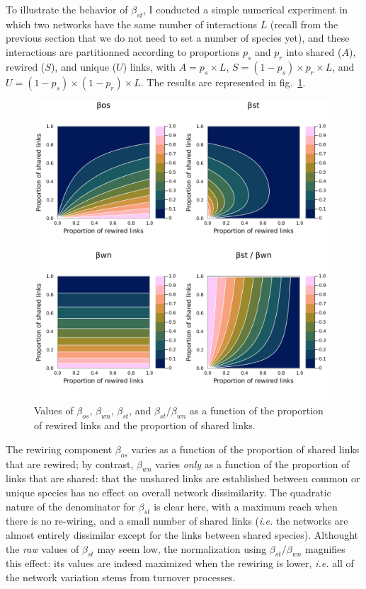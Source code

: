\documentclass[11pt]{article}
\makeatletter
\def\maxwidth{\ifdim\Gin@nat@width>\linewidth\linewidth
\else\Gin@nat@width\fi}
\let\Oldincludegraphics\includegraphics
\renewcommand{\includegraphics}[1]{\Oldincludegraphics[width=\maxwidth]{#1}}
\makeatother
\begin{document}
To illustrate the behavior of \(\beta_{st}\), I conducted a simple
numerical experiment in which two networks have the same number of
interactions \(L\) (recall from the previous section that we do not need
to set a number of species yet), and these interactions are partitionned
according to proportions \(p_s\) and \(p_r\) into shared (\(A\)),
rewired (\(S\)), and unique (\(U\)) links, with \(A = p_s\times L\),
\(S = (1-p_s)\times p_r\times L\), and
\(U = (1-p_s)\times (1-p_r)\times L\). The results are represented in
fig.~\ref{fig:numexp1}.

\begin{figure}
\hypertarget{fig:numexp1}{%
\centering
\includegraphics{figures/numexp1.png}
\caption{Values of \(\beta_{os}\), \(\beta_{wn}\), \(\beta_{st}\), and
\(\beta_{st}/\beta_{wn}\) as a function of the proportion of rewired
links and the proportion of shared links.}\label{fig:numexp1}
}
\end{figure}

The rewiring component \(\beta_{os}\) varies as a function of the
proportion of shared links that are rewired; by contrast, \(\beta_{wn}\)
varies \emph{only} as a function of the proportion of links that are
shared: that the unshared links are established between common or unique
species has no effect on overall network dissimilarity. The quadratic
nature of the denominator for \(\beta_{st}\) is clear here, with a
maximum reach when there is no re-wiring, and a small number of shared
links (\emph{i.e.} the networks are almost entirely dissimilar except
for the links between shared species). Althought the \emph{raw} values
of \(\beta_{st}\) may seem low, the normalization using
\(\beta_{st}/\beta_{wn}\) magnifies this effect: its values are indeed
maximized when the rewiring is lower, \emph{i.e.} all of the network
variation stems from turnover processes.
\end{document}
